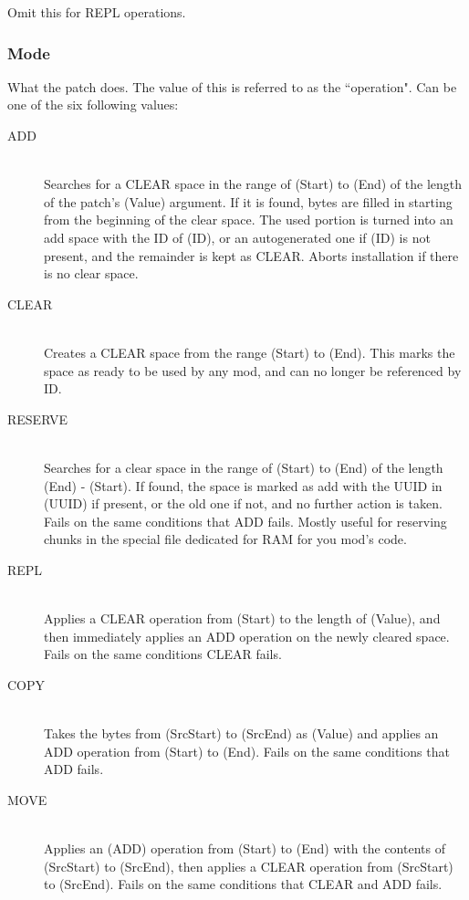 \documentclass[12pt,a4paper,notitlepage]{article}
\begin{document}
Omit this for REPL operations.

\subsubsection{Mode}
What the patch does. The value of this is referred to as the ``operation". Can be one of the six following values:

\begin{description}
\item[ADD] \hfill \\ 
    Searches for a CLEAR space in the range of (Start) to (End) of the length of the patch's (Value) argument. If it is found, bytes are filled in starting from the beginning of the clear space. The used portion is turned into an add space with the ID of (ID), or an autogenerated one if (ID) is not present, and the remainder is kept as CLEAR. Aborts installation if there is no clear space.
\item[CLEAR] \hfill \\
    Creates a CLEAR space from the range (Start) to (End). This marks the space as ready to be used by any mod, and can no longer be referenced by ID.
\item[RESERVE] \hfill \\
    Searches for a clear space in the range of (Start) to (End) of the length (End) - (Start). If found, the space is marked as add with the UUID in (UUID) if present, or the old one if not, and no further action is taken. Fails on the same conditions that ADD fails. Mostly useful for reserving chunks in the special file dedicated for RAM for you mod's code.
\item[REPL] \hfill \\
    Applies a CLEAR operation from (Start) to the length of (Value), and then immediately applies an ADD operation on the newly cleared space. Fails on the same conditions CLEAR fails.
\item[COPY] \hfill \\
    Takes the bytes from (SrcStart) to (SrcEnd) as (Value) and applies an ADD operation from (Start) to (End). Fails on the same conditions that ADD fails.
\item[MOVE] \hfill \\
    Applies an (ADD) operation from (Start) to (End) with the contents of (SrcStart) to (SrcEnd), then applies a CLEAR operation from (SrcStart) to (SrcEnd). Fails on the same conditions that CLEAR and ADD fails.
\end{description}
\end{document}
